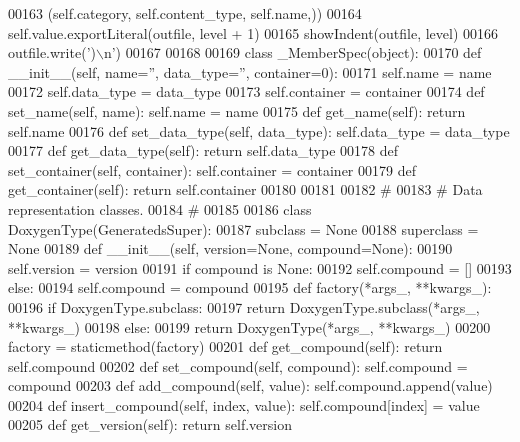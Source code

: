 \begin{DoxyCode}
{{{{{{{{{{{{{{{{{{{{00163                 (self.category, self.content_type, self.name,))
00164             self.value.exportLiteral(outfile, level + 1)
00165             showIndent(outfile, level)
00166             outfile.write(\textcolor{stringliteral}{')\(\backslash\)n'})
00167 
00168 
00169 \textcolor{keyword}{class }_MemberSpec(object):
00170     \textcolor{keyword}{def }__init__(self, name='', data\_type='', container=0):
00171         self.name = name
00172         self.data_type = data\_type
00173         self.container = container
00174     \textcolor{keyword}{def }set_name(self, name): self.name = name
00175     \textcolor{keyword}{def }get_name(self): \textcolor{keywordflow}{return} self.name
00176     \textcolor{keyword}{def }set_data_type(self, data\_type): self.data\_type = data\_type
00177     \textcolor{keyword}{def }get_data_type(self): \textcolor{keywordflow}{return} self.data\_type
00178     \textcolor{keyword}{def }set_container(self, container): self.container = container
00179     \textcolor{keyword}{def }get_container(self): \textcolor{keywordflow}{return} self.container
00180 
00181 
00182 \textcolor{comment}{#}
00183 \textcolor{comment}{# Data representation classes.}
00184 \textcolor{comment}{#}
00185 
00186 \textcolor{keyword}{class }DoxygenType(GeneratedsSuper):
00187     subclass = \textcolor{keywordtype}{None}
00188     superclass = \textcolor{keywordtype}{None}
00189     \textcolor{keyword}{def }__init__(self, version=None, compound=None):
00190         self.version = version
00191         \textcolor{keywordflow}{if} compound \textcolor{keywordflow}{is} \textcolor{keywordtype}{None}:
00192             self.compound = []
00193         \textcolor{keywordflow}{else}:
00194             self.compound = compound
00195     \textcolor{keyword}{def }factory(*args\_, **kwargs\_):
00196         \textcolor{keywordflow}{if} DoxygenType.subclass:
00197             \textcolor{keywordflow}{return} DoxygenType.subclass(*args\_, **kwargs\_)
00198         \textcolor{keywordflow}{else}:
00199             \textcolor{keywordflow}{return} DoxygenType(*args\_, **kwargs\_)
00200     factory = staticmethod(factory)
00201     \textcolor{keyword}{def }get_compound(self): \textcolor{keywordflow}{return} self.compound
00202     \textcolor{keyword}{def }set_compound(self, compound): self.compound = compound
00203     \textcolor{keyword}{def }add_compound(self, value): self.compound.append(value)
00204     \textcolor{keyword}{def }insert_compound(self, index, value): self.compound[index] = value
00205     \textcolor{keyword}{def }get_version(self): \textcolor{keywordflow}{return} self.version
}}}}}}}}}}}}}}}}}}}}
\end{DoxyCode}
